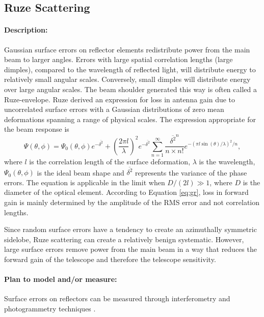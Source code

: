 \subsection{Ruze Scattering} \label{sec:ruze}

\paragraph{Description:}

Gaussian surface errors on reflector elements redistribute power from the main beam to larger angles. Errors with large spatial correlation lengths (large dimples), compared to the wavelength of reflected light, will distribute energy to relatively small angular scales. Conversely, small dimples will distribute energy over large angular scales. The beam shoulder generated this way is often called a Ruze-envelope. Ruze derived an expression for loss in antenna gain due to uncorrelated surface errors with a Gaussian distributions of zero mean deformations spanning a range of physical scales. The expression appropriate for the beam response is \cite{Ruze1966}
\begin{equation} 
\Psi(\theta,\phi) = \Psi_0(\theta,\phi) e^{-\overline{\delta^2}} + \left( \frac{2 \pi l}{\lambda} \right)^2 e^{-\overline{\delta^2}} \sum_{n=1}^{\infty} \frac{\overline{\delta^2}^n}{n \times n!} e^{-\left(\pi l \sin(\theta) / \lambda \right)^2/n},
\label{eq:gr}
\end{equation}
where $l$ is the correlation length of the surface deformation, $\lambda$ is the wavelength, $\Psi_0(\theta,\phi)$ is the ideal beam shape and $\overline{\delta^2}$ represents the variance of the phase errors. The equation is applicable in the limit when $D/(2l) \gg 1$, where $D$ is the diameter of the optical element. According to Equation \ref{eq:gr}, loss in forward gain is mainly determined by the amplitude of the RMS error and not correlation lengths.

Since random surface errors have a tendency to create an azimuthally symmetric sidelobe, Ruze scattering can create a relatively benign systematic. However, large surface errors remove power from the main beam in a way that reduces the forward gain of the telescope and therefore the telescope sensitivity.

\paragraph{Plan to model and/or measure:}
Surface errors on reflectors can be measured through interferometry and photogrammetry techniques \cite{Hincks2008, Tauber2010}.

